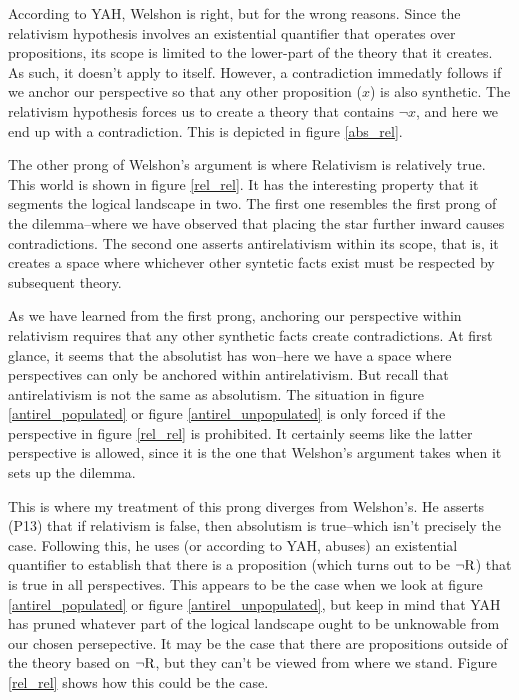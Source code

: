 \documentclass[12pt]{article}
\begin{document}
\begin{flushleft}
According to YAH, Welshon is right, but for the wrong reasons.
Since the relativism hypothesis involves an existential quantifier that operates over propositions, its scope is limited to the lower-part of the theory that it creates.
As such, it doesn't apply to itself.
However, a contradiction immedatly follows if we anchor our perspective so that any other proposition ($x$) is also synthetic.
The relativism hypothesis forces us to create a theory that contains $\neg x$, and here we end up with a contradiction.
This is depicted in figure \ref{abs_rel}.

The other prong of Welshon's argument is where Relativism is relatively true.
This world is shown in figure \ref{rel_rel}.
It has the interesting property that it segments the logical landscape in two.
The first one resembles the first prong of the dilemma--where we have observed that placing the star further inward causes contradictions.
The second one asserts antirelativism within its scope, that is, it creates a space where whichever other syntetic facts exist must be respected by subsequent theory.

As we have learned from the first prong, anchoring our perspective within relativism requires that any other synthetic facts create contradictions.
At first glance, it seems that the absolutist has won--here we have a space where perspectives can only be anchored within antirelativism.
But recall that antirelativism is not the same as absolutism.
The situation in figure \ref{antirel_populated} or figure \ref{antirel_unpopulated} is only forced if the perspective in figure \ref{rel_rel} is prohibited.
It certainly seems like the latter perspective is allowed, since it is the one that Welshon's argument takes when it sets up the dilemma.

This is where my treatment of this prong diverges from Welshon's.
He asserts (P13) that if relativism is false, then absolutism is true--which isn't precisely the case.
Following this, he uses (or according to YAH, abuses) an existential quantifier to establish that there is a proposition (which turns out to be $\neg \textnormal{R}$) that is true in all perspectives.
This appears to be the case when we look at figure \ref{antirel_populated} or figure \ref{antirel_unpopulated}, but keep in mind that YAH has pruned whatever part of the logical landscape ought to be unknowable from our chosen persepective.
It may be the case that there are propositions outside of the theory based on $\neg \textnormal{R}$, but they can't be viewed from where we stand.
Figure \ref{rel_rel} shows how this could be the case.


\end{flushleft}
\end{document}
